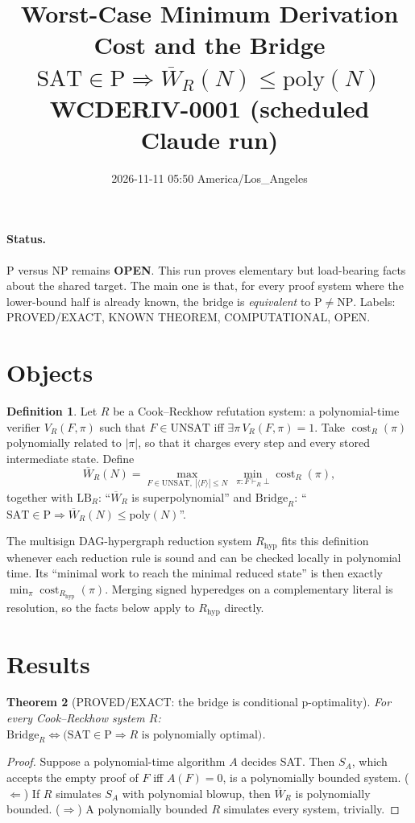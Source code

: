 \documentclass[11pt]{article}
\title{Worst-Case Minimum Derivation Cost and the Bridge\\
$\mathrm{SAT}\in\mathrm{P}\Rightarrow \overline W_R(N)\le\mathrm{poly}(N)$\\
\large WCDERIV-0001 (scheduled Claude run)}
\date{2026-11-11 05:50 America/Los\_Angeles}
\newtheorem{theorem}{Theorem}
\theoremstyle{definition}
\newtheorem{definition}[theorem]{Definition}
\newcommand{\WR}{\overline W_R}
\begin{document}
\maketitle

\paragraph{Status.} P versus NP remains \textbf{OPEN}. This run proves
elementary but load-bearing facts about the shared target. The main one is that,
for every proof system where the lower-bound half is already known, the bridge
is \emph{equivalent} to $\mathrm{P}\ne\mathrm{NP}$. Labels: PROVED/EXACT,
KNOWN THEOREM, COMPUTATIONAL, OPEN.

\section{Objects}
\begin{definition}
Let $R$ be a Cook--Reckhow refutation system: a polynomial-time verifier $V_R(F,\pi)$
such that $F\in\mathrm{UNSAT}$ iff $\exists\pi\,V_R(F,\pi)=1$. Take
$\operatorname{cost}_R(\pi)$ polynomially related to $|\pi|$, so that it charges
every step and every stored intermediate state. Define
\[
\WR(N)=\max_{F\in\mathrm{UNSAT},\ |\langle F\rangle|\le N}\ \min_{\pi:F\vdash_R\bot}\operatorname{cost}_R(\pi),
\]
together with $\mathrm{LB}_R$: ``$\WR$ is superpolynomial'' and
$\mathrm{Bridge}_R$: ``$\mathrm{SAT}\in\mathrm{P}\Rightarrow\WR(N)\le\mathrm{poly}(N)$''.
\end{definition}
The multisign DAG-hypergraph reduction system $R_{\mathrm{hyp}}$ fits this
definition whenever each reduction rule is sound and can be checked locally in
polynomial time. Its ``minimal work to reach the minimal reduced state'' is then exactly
$\min_\pi\operatorname{cost}_{R_{\mathrm{hyp}}}(\pi)$. Merging signed hyperedges on a
complementary literal is resolution, so the facts below apply to $R_{\mathrm{hyp}}$ directly.

\section{Results}
\begin{theorem}[PROVED/EXACT: the bridge is conditional p-optimality]\label{t:opt}
For every Cook--Reckhow system $R$:
$\mathrm{Bridge}_R\iff\big(\mathrm{SAT}\in\mathrm{P}\Rightarrow R\text{ is polynomially optimal}\big)$.
\end{theorem}
\begin{proof}
Suppose a polynomial-time algorithm $A$ decides SAT. Then $S_A$, which accepts the empty
proof of $F$ iff $A(F)=0$, is a polynomially bounded system. ($\Leftarrow$) If $R$
simulates $S_A$ with polynomial blowup, then $\WR$ is polynomially bounded.
($\Rightarrow$) A polynomially bounded $R$ simulates every system, trivially.
\end{proof}
\end{document}
